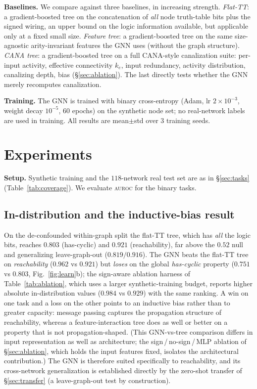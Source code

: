 \documentclass[journal]{IEEEtran}
\newcommand{\auroc}{\textsc{auroc}}
\begin{document}
\textbf{Baselines.} We compare against three baselines, in increasing strength.
\emph{Flat-TT}: a gradient-boosted tree on the concatenation of \emph{all} node
truth-table bits plus the signed wiring, an upper bound on the logic information
available, but applicable only at a fixed small size. \emph{Feature tree}: a
gradient-boosted tree on the same size-agnostic arity-invariant features the GNN uses
(without the graph structure). \emph{CANA tree}: a gradient-boosted tree on a full
CANA-style canalization suite: per-input activity, effective connectivity $k_e$, input
redundancy, activity distribution, canalizing depth, bias (\S\ref{sec:ablation}). The
last directly tests whether the GNN merely recomputes canalization.

\textbf{Training.} The GNN is trained with binary cross-entropy (Adam, lr $2\times
10^{-3}$, weight decay $10^{-5}$, $60$ epochs) on the synthetic node set; no real-network
labels are used in training. All results are mean$\pm$std over $3$ training seeds.

\section{Experiments}
\textbf{Setup.} Synthetic training and the $118$-network real test set are as in
\S\ref{sec:tasks} (Table~\ref{tab:coverage}). We evaluate \auroc{} for the binary tasks.

\subsection{In-distribution and the inductive-bias result}
On the de-confounded within-graph split the flat-TT tree, which has \emph{all} the
logic bits, reaches $0.803$ (has-cyclic) and $0.921$ (reachability), far above the
$0.52$ null and generalizing leave-graph-out ($0.819/0.916$). The GNN beats the flat-TT
tree on \emph{reachability} ($0.962$ vs $0.921$) but \emph{loses} on the global
\emph{has-cyclic} property ($0.751$ vs $0.803$, Fig.~\ref{fig:learn}b); the sign-aware
ablation harness of Table~\ref{tab:ablation}, which uses a larger synthetic-training
budget, reports higher absolute in-distribution values ($0.984$ vs $0.929$) with the same
ranking. A win on one task
and a loss on the other points to an inductive bias rather than to greater capacity:
message passing captures the propagation structure of reachability, whereas a
feature-interaction tree does as well or better on a property that is not
propagation-shaped. (This GNN-vs-tree comparison differs in input representation as well
as architecture; the sign\,/\,no-sign\,/\,MLP ablation of \S\ref{sec:ablation}, which holds
the input features fixed, isolates the architectural contribution.) The GNN is therefore
suited specifically to reachability, and its cross-network generalization is established
directly by the zero-shot transfer of \S\ref{sec:transfer} (a leave-graph-out test by
construction).
\end{document}
